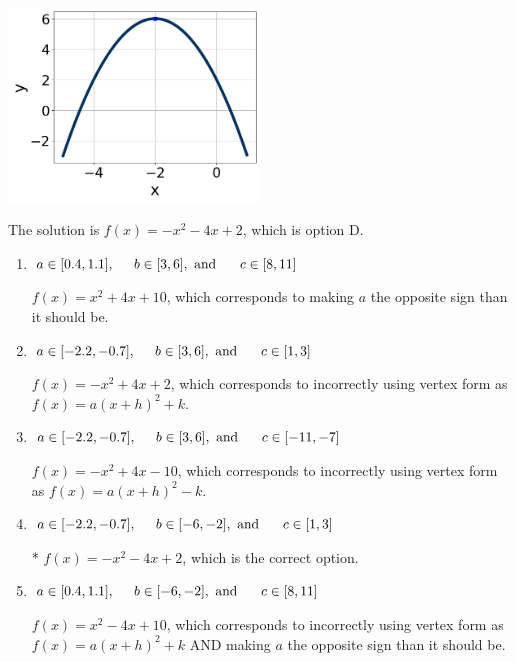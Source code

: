 \documentclass{extbook}[14pt]
\begin{document}
\begin{enumerate}
{\begin{center}
    \includegraphics[width=0.5\textwidth]{../Figures/quadraticGraphToEquationB.png}
\end{center}


The solution is \( f(x) = -x^{2} -4 x + 2 \), which is option D.\begin{enumerate}[label=\Alph*.]
\item \( a \in [0.4, 1.1], \hspace*{5mm} b \in [3, 6], \text{ and } \hspace*{5mm} c \in [8, 11] \)

$f(x)=x^{2} +4 x + 10$, which corresponds to making $a$ the opposite sign than it should be.
\item \( a \in [-2.2, -0.7], \hspace*{5mm} b \in [3, 6], \text{ and } \hspace*{5mm} c \in [1, 3] \)

$f(x)=-x^{2} +4 x + 2$, which corresponds to incorrectly using vertex form as $f(x) = a(x+h)^2+k$.
\item \( a \in [-2.2, -0.7], \hspace*{5mm} b \in [3, 6], \text{ and } \hspace*{5mm} c \in [-11, -7] \)

$f(x)=-x^{2} +4 x -10$, which corresponds to incorrectly using vertex form as $f(x) = a(x+h)^2 - k$.
\item \( a \in [-2.2, -0.7], \hspace*{5mm} b \in [-6, -2], \text{ and } \hspace*{5mm} c \in [1, 3] \)

* $f(x)=-x^{2} -4 x + 2$, which is the correct option.
\item \( a \in [0.4, 1.1], \hspace*{5mm} b \in [-6, -2], \text{ and } \hspace*{5mm} c \in [8, 11] \)

$f(x)=x^{2} -4 x + 10$, which corresponds to incorrectly using vertex form as $f(x) = a(x+h)^2+k$ AND making $a$ the opposite sign than it should be.
\end{enumerate}

}
\end{enumerate}
\end{document}
